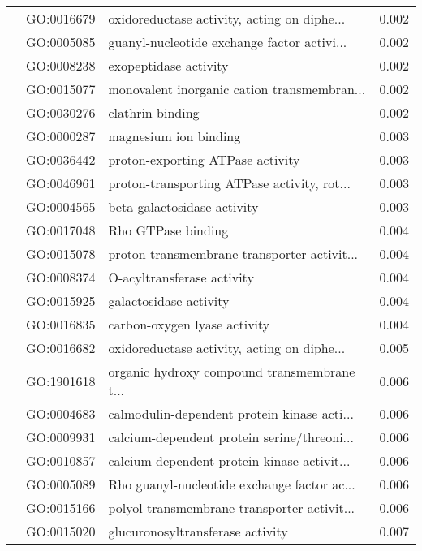 \begin{longtable}{lllr}
   & GO:0016679 &  oxidoreductase activity, acting on diphe... &         0.002 \\
   & GO:0005085 &  guanyl-nucleotide exchange factor activi... &         0.002 \\
   & GO:0008238 &                        exopeptidase activity &         0.002 \\
   & GO:0015077 &  monovalent inorganic cation transmembran... &         0.002 \\
   & GO:0030276 &                             clathrin binding &         0.002 \\
   & GO:0000287 &                        magnesium ion binding &         0.003 \\
   & GO:0036442 &             proton-exporting ATPase activity &         0.003 \\
   & GO:0046961 &  proton-transporting ATPase activity, rot... &         0.003 \\
   & GO:0004565 &                  beta-galactosidase activity &         0.003 \\
   & GO:0017048 &                           Rho GTPase binding &         0.004 \\
   & GO:0015078 &  proton transmembrane transporter activit... &         0.004 \\
   & GO:0008374 &                   O-acyltransferase activity &         0.004 \\
   & GO:0015925 &                       galactosidase activity &         0.004 \\
   & GO:0016835 &                 carbon-oxygen lyase activity &         0.004 \\
   & GO:0016682 &  oxidoreductase activity, acting on diphe... &         0.005 \\
   & GO:1901618 &  organic hydroxy compound transmembrane t... &         0.006 \\
   & GO:0004683 &  calmodulin-dependent protein kinase acti... &         0.006 \\
   & GO:0009931 &  calcium-dependent protein serine/threoni... &         0.006 \\
   & GO:0010857 &  calcium-dependent protein kinase activit... &         0.006 \\
   & GO:0005089 &  Rho guanyl-nucleotide exchange factor ac... &         0.006 \\
   & GO:0015166 &  polyol transmembrane transporter activit... &         0.006 \\
   & GO:0015020 &             glucuronosyltransferase activity &         0.007 \\

\end{longtable}

